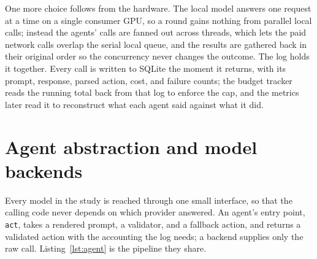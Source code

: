 One more choice follows from the hardware. The local model answers one request at a
time on a single consumer GPU, so a round gains nothing from parallel local calls;
instead the agents' calls are fanned out across threads, which lets the paid
network calls overlap the serial local queue, and the results are gathered back in
their original order so the concurrency never changes the outcome. The log holds it
together. Every call is written to SQLite the moment it returns, with
its prompt, response, parsed action, cost, and failure counts; the budget tracker
reads the running total back from that log to enforce the cap, and the metrics
later read it to reconstruct what each agent said against what it did.

\section{Agent abstraction and model backends}
\label{sec:agents}

Every model in the study is reached through one small interface, so that the
calling code never depends on which provider answered. An agent's entry point,
\texttt{act}, takes a rendered prompt, a validator, and a fallback action, and
returns a validated action with the accounting the log needs; a backend supplies
only the raw call. Listing~\ref{lst:agent} is the pipeline they share.

